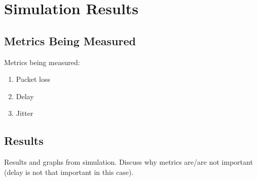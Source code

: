 
\chapter{Simulation Results} 

\section{Metrics Being Measured}

Metrics being measured: 

\begin{enumerate}
\item Packet loss
\item Delay
\item Jitter
\end{enumerate}

\section{Results}

Results and graphs from simulation.
Discuss why metrics are/are not important (delay is not that important in this case).